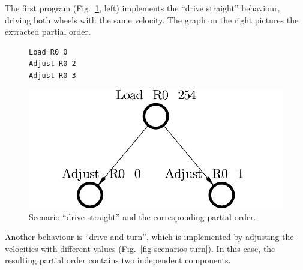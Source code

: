The first program (Fig.~\ref{fig-scenarios-drive-straight}, left) implements
the ``drive straight'' behaviour, driving both wheels with the same velocity.
The graph on the right pictures the extracted partial order.

\begin{figure}
\centering
  \begin{minipage}[b]{0.5\textwidth}
\begin{verbatim}
Load R0 0
Adjust R0 2
Adjust R0 3
\end{verbatim}
\vspace{5mm}
\end{minipage}
\begin{minipage}[b]{0.4\textwidth}
\includegraphics[scale=0.35]{img/ataed-scenario-drive-straight.pdf}
\end{minipage}
\caption{Scenario ``drive straight'' and the corresponding
partial order.\label{fig-scenarios-drive-straight}}
\end{figure}

Another behaviour is ``drive and turn'', which is implemented by adjusting the
velocities with different values (Fig.~\ref{fig-scenarios-turn}). In this case,
the resulting partial order contains two independent components.

